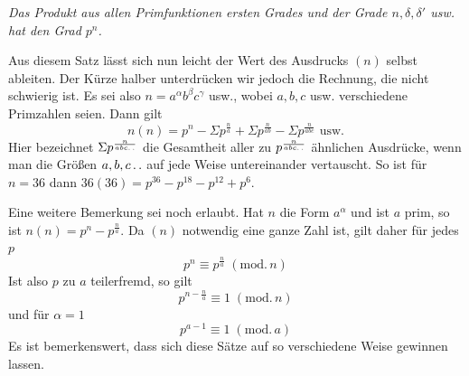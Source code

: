 \emph{Das Produkt aus allen Primfunktionen ersten Grades und der Grade $n,\delta,\delta'$ usw. hat den Grad $p^n$.}

Aus diesem Satz lässt sich nun leicht der Wert des Ausdrucks $(n)$ selbst ableiten. Der Kürze halber unterdrücken wir jedoch die Rechnung, die nicht schwierig ist. Es sei also $n=a^\alpha b^\beta c^\gamma$ usw., wobei $a,b,c$ usw. verschiedene Primzahlen seien. Dann gilt
\[
n(n)=p^n-\Sigma p^{\frac na}+\Sigma p^{\frac n{ab}}-\Sigma p^{\frac n{abc}}\text{ usw.}
\]
Hier bezeichnet $\Sigma p^{\frac n{abc\mathinner{.\,.}}}$ die Gesamtheit aller zu $p^{\frac n{abc\mathinner{.\,.}}}$ ähnlichen Ausdrücke, wenn man die Größen $a,b,c\mathinner{.\,.}$ auf jede Weise untereinander vertauscht. So ist für $n=36$ dann $36(36)=p^{36}-p^{18}-p^{12}+p^6$.

Eine weitere Bemerkung sei noch erlaubt. Hat $n$ die Form $a^\alpha$ und ist $a$ prim, so ist $n(n)=p^n-p^{\frac na}$. Da $(n)$ notwendig eine ganze Zahl ist, gilt daher für jedes $p$
\[
p^n\equiv p^{\frac na}\;(\mathrm{mod.}\,n)
\]
Ist also $p$ zu $a$ teilerfremd, so gilt
\[
p^{n-\frac na}\equiv1\;(\mathrm{mod.}\,n)
\]
und für $\alpha=1$
\[
p^{a-1}\equiv1\;(\mathrm{mod.}\,a)
\]
Es ist bemerkenswert, dass sich diese Sätze auf so verschiedene Weise gewinnen lassen.
